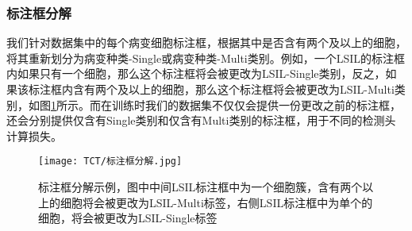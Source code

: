 \subsubsection{标注框分解}
\label{sec:标注框分解}
\par 我们针对数据集中的每个病变细胞标注框，根据其中是否含有两个及以上的细胞，将其重新划分为病变种类-Single或病变种类-Multi类别。例如，一个LSIL的标注框内如果只有一个细胞，那么这个标注框将会被更改为LSIL-Single类别，反之，如果该标注框内含有两个及以上的细胞，那么这个标注框将会被更改为LSIL-Multi类别，如图\ref{pic:标注框分解}所示。而在训练时我们的数据集不仅仅会提供一份更改之前的标注框，还会分别提供仅含有Single类别和仅含有Multi类别的标注框，用于不同的检测头计算损失。
\begin{figure}[h]
    \centering
    \texttt{[image: TCT/标注框分解.jpg]}
    \caption{标注框分解示例，图中中间LSIL标注框中为一个细胞簇，含有两个以上的细胞将会被更改为LSIL-Multi标签，右侧LSIL标注框中为单个的细胞，将会被更改为LSIL-Single标签}
    \label{pic:标注框分解}
\end{figure}

